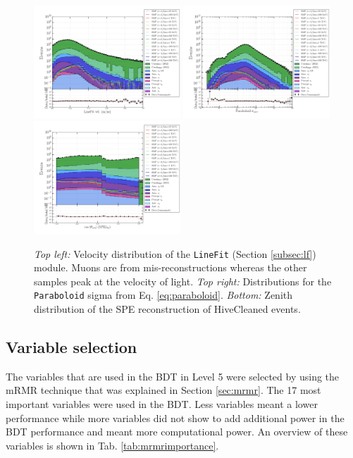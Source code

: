 \begin{figure}
\centering
\includegraphics[width=0.49\textwidth]{chapter8/img/1D_stack_linefitvelocity}
\includegraphics[width=0.49\textwidth]{chapter8/img/1D_stack_sigma_corr_paraboloid}
\includegraphics[width=0.49\textwidth]{chapter8/img/1D_stack_spefit1_hc_coszenith}
\caption{\textit{Top left: }Velocity distribution of the \texttt{LineFit} (Section \ref{subsec:lf}) module. Muons are from mis-reconstructions whereas the other samples peak at the velocity of light. \textit{Top right: }Distributions for the \texttt{Paraboloid} sigma from Eq. \ref{eq:paraboloid}. \textit{Bottom: }Zenith distribution of the SPE reconstruction of HiveCleaned events.}
\label{fig:remainingvariables}
\end{figure}

\subsection{Variable selection}
The variables that are used in the BDT in Level 5 were selected by using the mRMR technique that was explained in Section \ref{sec:mrmr}. The 17 most important variables were used in the BDT. Less variables meant a lower performance while more variables did not show to add additional power in the BDT performance and meant more computational power. An overview of these variables is shown in Tab. \ref{tab:mrmrimportance}.

